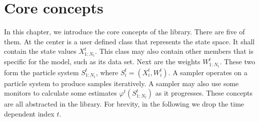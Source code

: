 %
%
%
%

\chapter{Core concepts}
\label{chap:Core concepts}

In this chapter, we introduce the core concepts of the library. There are five
of them. At the center is a user defined class that represents the state space.
It shall contain the state values $X_{1:N_t}^t$. This class may also contain
other members that is specific for the model, such as its data set. Next are
the weights $W_{1:N_t}^t$. These two form the particle system $S_{1:N_t}^t$,
where $S_i^t = (X_i^t,W_i^t)$. A sampler operates on a particle system to
produce samples iteratively. A sampler may also use some monitors to calculate
some estimates $\varphi^t(S_{1:N_t}^t)$ as it progresses. These concepts are
all abstracted in the library. For brevity, in the following we drop the time
dependent index $t$.


